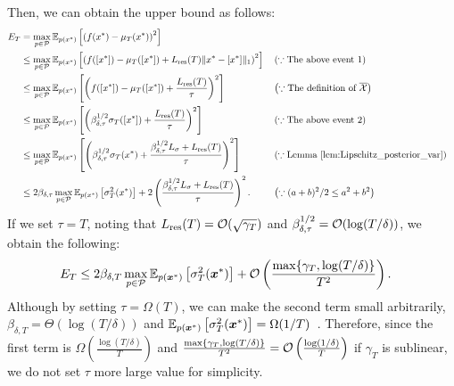 Then, we can obtain the upper bound as follows:
\begin{align*}
    E_T &= \max_{p \in \cP} \EE_{p(\*x^*)} \left[ \left( f(\*x^*) - \mu_T(\*x^*) \right)^2 \right] \\
    &\leq \max_{p \in \cP} \EE_{p(\*x^*)} \left[ \left( f([\*x^*]) - \mu_T([\*x^*]) + L_{\rm res}(T) \| \*x^* - [\*x^*] \|_1 \right)^2  \right] 
    && \left(\because \text{The above event~1} \right) \\
    &\leq \max_{p \in \cP} \EE_{p(\*x^*)} \left[ \left( f([\*x^*]) - \mu_T([\*x^*]) + \frac{L_{\rm res}(T)}{\tau} \right)^2  \right] 
    && \left(\because \text{The definition of $\overline{\cX}$} \right) \\
    &\leq \max_{p \in \cP} \EE_{p(\*x^*)} \left[ \left( \beta_{\delta, \tau}^{1/2} \sigma_T([\*x^*]) + \frac{L_{\rm res}(T)}{\tau} \right)^2  \right] 
    && \left(\because \text{The above event~2} \right) \\
    &\leq \max_{p \in \cP} \EE_{p(\*x^*)} \left[ \left( \beta_{\delta, \tau}^{1/2} \sigma_T(\*x^*) + \frac{\beta_{\delta, \tau}^{1/2} L_{\sigma} + L_{\rm res}(T)}{\tau} \right)^2  \right] 
    && \left(\because \text{Lemma~\ref{lem:Lipschitz_posterior_var}} \right) \\
    &\leq 2 \beta_{\delta, \tau} \max_{p \in \cP} \EE_{p(\*x^*)} \left[  \sigma_T^2(\*x^*) \right] + 2 \left( \frac{\beta_{\delta, \tau}^{1/2} L_{\sigma} + L_{\rm res}(T)}{\tau} \right)^2.
    && \left(\because (a + b)^2 / 2 \leq a^2 + b^2 \right)
\end{align*}
%
If we set $\tau = T$, noting that $L_{\rm res}(T) = {\cal O}(\sqrt{\gamma_T})$ and $\beta_{\delta, \tau}^{1/2} = {\cal O}(\log(T / \delta))$, we obtain the following:
\begin{align*}
    E_T 
    &\leq 2 \beta_{\delta, T} \max_{p \in {\cal P}} \mathbb{E}_{p(\boldsymbol{x}^*)} \left[  \sigma_T^2(\boldsymbol{x}^*) \right] 
    + {\cal O} \left( \frac{\max\{\gamma_T, \log(T / \delta)\}}{T^2} \right).
\end{align*}
%
Although by setting $\tau = \Omega(T)$, we can make the second term small arbitrarily, $\beta_{\delta, T} = \Theta\left( \log( T / \delta) \right)$ and $\mathbb{E}_{p(\boldsymbol{x}^*)} \left[  \sigma_T^2(\boldsymbol{x}^*) \right] = \Omega(1 / T)$~\citep[Lemma~4.2 in][]{takeno2024-posterior}.
%
Therefore, since the first term is $\Omega \left( \frac{\log( T / \delta)}{T} \right)$ and $\frac{\max\{\gamma_T, \log(T / \delta)\}}{T^2} = {\cal O}\left( \frac{\log( 1 / \delta)}{T} \right)$ if $\gamma_T$ is sublinear, we do not set $\tau$ more large value for simplicity.

